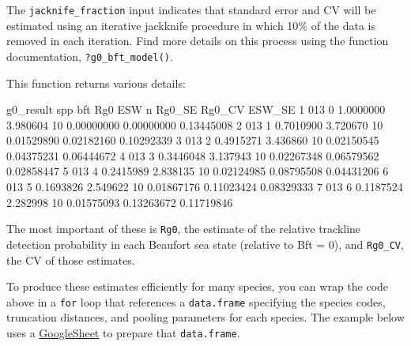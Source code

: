 \documentclass[
]{book}
\newenvironment{Shaded}{\begin{snugshade}}{\end{snugshade}}
\newcommand{\DecValTok}[1]{\textcolor[rgb]{0.00,0.00,0.81}{#1}}
\newcommand{\FloatTok}[1]{\textcolor[rgb]{0.00,0.00,0.81}{#1}}
\newcommand{\NormalTok}[1]{#1}
\begin{document}
The \texttt{jacknife\_fraction} input indicates that standard error and CV will be estimated using an iterative jackknife procedure in which 10\% of the data is removed in each iteration. Find more details on this process using the function documentation, \texttt{?g0\_bft\_model()}.

This function returns various details:

\begin{Shaded}
\begin{Highlighting}[]
\NormalTok{g0_result}
\NormalTok{  spp bft       Rg0      ESW  n     Rg0_SE     Rg0_CV     ESW_SE}
\DecValTok{1} \DecValTok{013}   \DecValTok{0} \FloatTok{1.0000000} \FloatTok{3.980604} \DecValTok{10} \FloatTok{0.00000000} \FloatTok{0.00000000} \FloatTok{0.13445008}
\DecValTok{2} \DecValTok{013}   \DecValTok{1} \FloatTok{0.7010900} \FloatTok{3.720670} \DecValTok{10} \FloatTok{0.01529890} \FloatTok{0.02182160} \FloatTok{0.10292339}
\DecValTok{3} \DecValTok{013}   \DecValTok{2} \FloatTok{0.4915271} \FloatTok{3.436860} \DecValTok{10} \FloatTok{0.02150545} \FloatTok{0.04375231} \FloatTok{0.06444672}
\DecValTok{4} \DecValTok{013}   \DecValTok{3} \FloatTok{0.3446048} \FloatTok{3.137943} \DecValTok{10} \FloatTok{0.02267348} \FloatTok{0.06579562} \FloatTok{0.02858447}
\DecValTok{5} \DecValTok{013}   \DecValTok{4} \FloatTok{0.2415989} \FloatTok{2.838135} \DecValTok{10} \FloatTok{0.02124985} \FloatTok{0.08795508} \FloatTok{0.04431206}
\DecValTok{6} \DecValTok{013}   \DecValTok{5} \FloatTok{0.1693826} \FloatTok{2.549622} \DecValTok{10} \FloatTok{0.01867176} \FloatTok{0.11023424} \FloatTok{0.08329333}
\DecValTok{7} \DecValTok{013}   \DecValTok{6} \FloatTok{0.1187524} \FloatTok{2.282998} \DecValTok{10} \FloatTok{0.01575093} \FloatTok{0.13263672} \FloatTok{0.11719846}
\end{Highlighting}
\end{Shaded}

The most important of these is \texttt{Rg0}, the estimate of the relative trackline detection probability in each Beaufort sea state (relative to Bft = 0), and \texttt{Rg0\_CV}, the CV of those estimates.

To produce these estimates efficiently for many species, you can wrap the code above in a \texttt{for} loop that references a \texttt{data.frame} specifying the species codes, truncation distances, and pooling parameters for each species. The example below uses a \href{https://docs.google.com/spreadsheets/d/1mzyGb2qMUkpXb2ChglVMx9ZXRaGpjq0C2-Xzlj6uYvg/edit?usp=sharing}{GoogleSheet} to prepare that \texttt{data.frame}.
\end{document}

